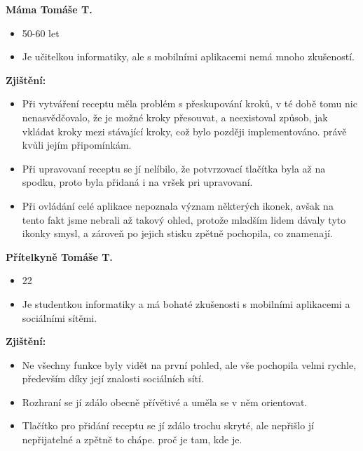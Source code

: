 \documentclass[a4paper, 11pt]{article}
\begin{document}
\noindent\textbf{Máma Tomáše T.} \\[-1em]
\begin{itemize}
    \item 50-60 let
    \item Je učitelkou informatiky, ale s mobilními aplikacemi nemá mnoho zkušeností.
\end{itemize}


\textbf{Zjištění:}
\begin{itemize}
    \item Při vytváření receptu měla problém s přeskupování kroků, v té době tomu nic nenasvědčovalo,
    že je možné kroky přesouvat, a neexistoval způsob, jak vkládat kroky mezi stávající kroky, což bylo později implementováno.
    právě kvůli jejím připomínkám.

    \item Při upravovaní receptu se jí nelíbilo, že potvrzovací tlačítka byla až na spodku, proto byla přidaná i na vršek
    pri upravovaní.

    \item Při ovládání celé aplikace nepoznala význam některých ikonek, avšak na tento fakt jsme
    nebrali až takový ohled, protože mladším lidem dávaly tyto ikonky smysl, a zároveň po jejich
    stisku zpětně pochopila, co znamenají.

\end{itemize}

\noindent\textbf{Přítelkyně Tomáše T.} \\[-1em]
\begin{itemize}
    \item 22
    \item Je studentkou informatiky a má bohaté zkušenosti s mobilními aplikacemi a sociálními sítěmi. 
\end{itemize}


\textbf{Zjištění:}
\begin{itemize}
    \item Ne všechny funkce byly vidět na první pohled, ale vše pochopila velmi rychle, především díky
    její znalosti sociálních sítí.

    \item Rozhraní se jí zdálo obecně přívětivé a uměla se v něm orientovat.

    \item Tlačítko pro přidání receptu se jí zdálo trochu skryté, ale nepřišlo jí nepřijatelné a zpětně to chápe. 
    proč je tam, kde je.

\end{itemize}
\end{document}
